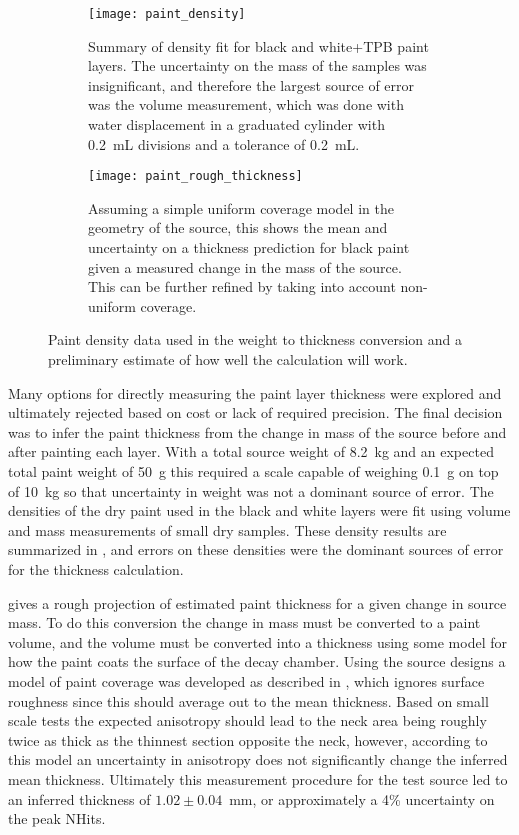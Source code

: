 \begin{figure}
\begin{subfigure}[t]{.46\textwidth}
\texttt{[image: paint\_density]}
\caption{Summary of density fit for black and white+TPB paint layers. The uncertainty on the mass of the samples was insignificant, and therefore the largest source of error was the volume measurement, which was done with water displacement in a graduated cylinder with 0.2~mL divisions and a tolerance of 0.2~mL.}
\label{fig:paintdensity}
\end{subfigure}
\hfill
\begin{subfigure}[t]{.46\textwidth}
\texttt{[image: paint\_rough\_thickness]}
\caption{Assuming a simple uniform coverage model in the geometry of the source, this shows the mean and uncertainty on a thickness prediction for black paint given a measured change in the mass of the source. This can be further refined by taking into account non-uniform coverage. }
\label{fig:paintthickness}
\end{subfigure}
\caption{Paint density data used in the weight to thickness conversion and a preliminary estimate of how well the calculation will work.}
\label{fig:weightmeasure}
\end{figure}

Many options for directly measuring the paint layer thickness were explored and ultimately rejected based on cost or lack of required precision. The final decision was to infer the paint thickness from the change in mass of the source before and after painting each layer. With a total source weight of 8.2~kg and an expected total paint weight of 50~g this required a scale capable of weighing 0.1~g on top of 10~kg so that uncertainty in weight was not a dominant source of error. The densities of the dry paint used in the black and white layers were fit using volume and mass measurements of small dry samples. These density results are summarized in , and errors on these densities were the dominant  sources of error for the thickness calculation. 

 gives a rough projection of estimated paint thickness for a given change in source mass. To do this conversion the change in mass must be converted to a paint volume, and the volume must be converted into a thickness using some model for how the paint coats the surface of the decay chamber. Using the source designs a model of paint coverage was developed as described in , which ignores surface roughness since this should average out to the mean thickness. Based on small scale tests the expected anisotropy should lead to the neck area being roughly twice as thick as the thinnest section opposite the neck, however, according to this model an uncertainty in anisotropy does not significantly change the inferred mean thickness. Ultimately this measurement procedure for the test source led to an inferred thickness of $1.02\pm0.04$~mm, or approximately a 4\% uncertainty on the peak NHits.

